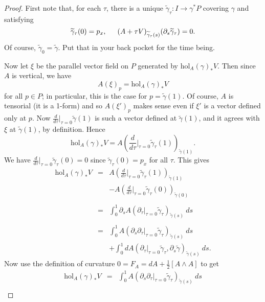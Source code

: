 \documentclass{article}
\newcommand{\intdd}[2]{\displaystyle \int_{#1}^{#2}}
\newcommand{\hol}{{\mathrm{hol}}}
\begin{document}
\begin{proof}
First note that, for each $\tau$, there is a unique $\widetilde{\gamma}_\tau: I \rightarrow \gamma^* P$ covering $\gamma$ and satisfying
\begin{equation}\label{a}
\widetilde{\gamma}_\tau(0) = p_x, \indent (A+ \tau V)_{\widetilde{\gamma}_\tau(s)}(\partial_s \widetilde{\gamma}_\tau) = 0.
\end{equation}
Of course, $\widetilde{\gamma}_0 = \widetilde{\gamma}$. Put that in your back pocket for the time being. 

Now let $\xi$ be the parallel vector field on $P$ generated by $\hol_A(\gamma)_* V $. Then since $A$ is vertical, we have
$$A(\xi)_p = \hol_A(\gamma)_* V $$
for all $p \in P$; in particular, this is the case for $p = \widetilde{\gamma}(1)$. Of course, $A$ is tensorial (it is a 1-form) and so $A(\xi')_p$ makes sense even if $\xi'$ is a vector defined only at $p$. Now $\frac{d}{d\tau} \vert_{\tau = 0} \widetilde{\gamma}(1)$ is such a vector defined at $\widetilde{\gamma}(1)$, and it agrees with $\xi$ at $\widetilde{\gamma}(1)$, by definition. Hence
$$\hol_A(\gamma)_*V = A\left( \frac{d}{d\tau} \vert_{\tau = 0} \widetilde{\gamma}_\tau(1) \right)_{\widetilde{\gamma}(1)}.$$
We have $\frac{d}{d\tau} \vert_{\tau = 0} \widetilde{\gamma}_\tau(0) = 0$ since $\widetilde{\gamma}_\tau(0) = p_x$ for all $\tau$. This gives
$$\begin{array}{rcl}
\hol_A(\gamma)_*V  & = & A\left( \frac{d}{d\tau} \vert_{\tau = 0} \widetilde{\gamma}_\tau(1) \right)_{\widetilde{\gamma}(1)}\\
&& - A\left( \frac{d}{d\tau} \vert_{\tau = 0} \widetilde{\gamma}_\tau(0) \right)_{\widetilde{\gamma}(0)}\\
&&\\
& =& \intdd{0}{1} \partial_s A\left( \partial_\tau \vert_{\tau = 0} \widetilde{\gamma}_\tau\right)_{\widetilde{\gamma}(s)} \: ds\\
&&\\
& = & \intdd{0}{1} A\left( \partial_s  \partial_\tau \vert_{\tau = 0} \widetilde{\gamma}_\tau \right)_{\widetilde{\gamma}(s)} \: ds\\
&& + \intdd{0}{1} dA( \partial_\tau \vert_{\tau = 0} \widetilde{\gamma}_\tau , \partial_s \widetilde{\gamma} )_{\widetilde{\gamma}(s)} \: ds.
\end{array}$$   
Now use the definition of curvature $0 = F_A = dA + \frac{1}{2}\left[ A \wedge A \right]$ to get
$$\begin{array}{rcl}
\hol_A(\gamma)_*V  & = & \intdd{0}{1} A\left( \partial_s  \partial_\tau \vert_{\tau = 0} \widetilde{\gamma}_\tau \right)_{\widetilde{\gamma}(s)} \: ds\\

\end{array}$$
\end{proof}
\end{document}
